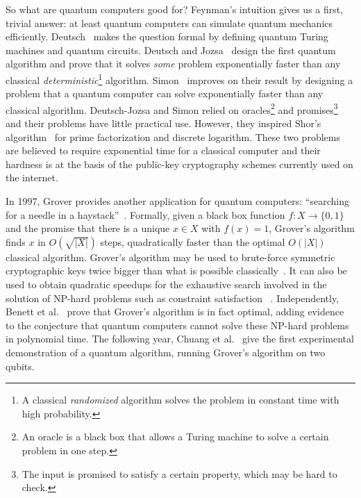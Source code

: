 So what are quantum computers good for? Feynman's intuition gives us a
first, trivial answer: at least quantum computers can simulate quantum
mechanics efficiently. Deutsch~\cite{Deutsch85a} makes the question formal by
defining quantum Turing machines and quantum circuits.
Deutsch and Jozsa~\cite{DeutschJozsa92}
design the first quantum algorithm and prove that it solves
\emph{some} problem exponentially faster than any classical
\emph{deterministic}\footnote
{A classical \emph{randomized} algorithm solves the
problem in constant time with high probability.} algorithm.
Simon~\cite{Simon94} improves on their result by designing a problem that a
quantum computer can solve exponentially faster than any classical
algorithm. Deutsch-Jozsa and Simon relied on
oracles\footnote{An oracle is
a black box that allows a Turing machine to solve a certain problem in one step.}
and promises\footnote
{The input is promised to satisfy a certain property, which may be hard to check.}
and their problems have little practical use. However, they inspired Shor's
algorithm~\cite{Shor94a} for prime factorization and discrete logarithm. These
two problems are believed to require exponential time for a classical
computer and their hardness is at the basis of the public-key
cryptography schemes currently used on the internet.

In 1997, Grover provides another application for quantum computers:
``searching for a needle in a haystack''~\cite{Grover97}. Formally,
given a black box function $f : X \to \{0, 1\}$ and the promise that
there is a unique $x \in X$ with $f(x) = 1$, Grover's algorithm finds
$x$ in $O(\sqrt{|X|})$ steps, quadratically faster than the optimal
$O(|X|)$ classical algorithm. Grover's algorithm may be used to
brute-force symmetric cryptographic keys twice bigger than what is
possible classically~\cite{BernsteinEtAl09}. It can also be used to
obtain quadratic speedups for the exhaustive search involved in the
solution of NP-hard problems such as constraint satisfaction
~\cite{Ambainis04}. Independently, Benett et al.~\cite{BennettEtAl97}
prove that Grover's algorithm is in fact optimal, adding evidence to the
conjecture that quantum computers cannot solve these NP-hard problems in
polynomial time. The following year, Chuang et al.~\cite{ChuangEtAl98} give
the first experimental demonstration of a quantum algorithm, running
Grover's algorithm on two qubits.

